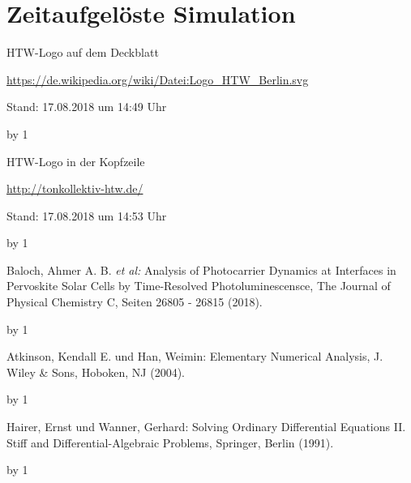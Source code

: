 \documentclass[
	pagesize,
	fontsize=12pt,
	paper=a4,
	oneside,
   reqno
]{scrartcl}
\begin{document}
\section{Zeitaufgelöste Simulation} \label{sec:ZeitaufgeloesteSimulation}

\clearpage

\newpage
\newcount\Quellennummer
{}

\renewcommand\refname{Literaturverzeichnis}

\begin{thebibliography}{999}
{\setlength{\emergencystretch}{3cm}%

HTW-Logo auf dem Deckblatt\par
\url{https://de.wikipedia.org/wiki/Datei:Logo_HTW_Berlin.svg} \par
 Stand: 17.08.2018 um 14:49 Uhr

\advance\Quellennummer by 1
 
HTW-Logo in der Kopfzeile\par
\url{http://tonkollektiv-htw.de/} \par
 Stand: 17.08.2018 um 14:53 Uhr

\advance\Quellennummer by 1

Baloch, Ahmer A. B. \textit{et al:} \glqq Analysis of Photocarrier Dynamics at Interfaces in Pervoskite Solar Cells by Time-Resolved Photoluminescensce\grqq{}, The Journal of Physical Chemistry C, Seiten 26805 - 26815 (2018).

\advance\Quellennummer by 1

Atkinson, Kendall E. und Han, Weimin: \glqq Elementary Numerical Analysis\grqq{}, J. Wiley \& Sons, Hoboken, NJ (2004).

\advance\Quellennummer by 1

Hairer, Ernst und Wanner, Gerhard: \glqq Solving Ordinary Differential Equations II. Stiff and Differential-Algebraic Problems\grqq{}, Springer, Berlin (1991).

\advance\Quellennummer by 1

}
\end{thebibliography}
\end{document}
